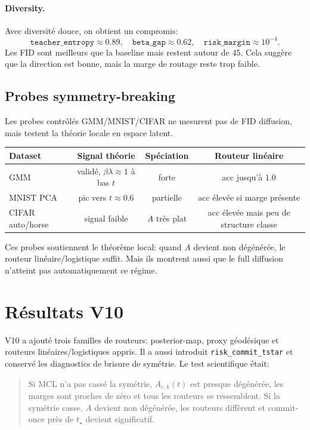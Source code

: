 \documentclass[11pt,a4paper]{article}
\newcommand{\1}{\mathbf{1}}
\begin{document}
\paragraph{Diversity.}
Avec diversité douce, on obtient un compromis:
\[
\texttt{teacher\_entropy}\approx 0.89,
\quad
\texttt{beta\_gap}\approx 0.62,
\quad
\texttt{risk\_margin}\approx 10^{-4}.
\]
Les FID sont meilleurs que la baseline mais restent autour de $45$. Cela suggère que la direction est bonne, mais la marge de routage reste trop faible.

\subsection{Probes symmetry-breaking}

Les probes contrôlés GMM/MNIST/CIFAR ne mesurent pas de FID diffusion, mais testent la théorie locale en espace latent.

\begin{center}
\begin{tabular}{lccc}
\toprule
Dataset & Signal théorie & Spéciation & Routeur linéaire\\
\midrule
GMM & validé, $\beta\lambda\approx1$ à bas $t$ & forte & acc jusqu'à $1.0$\\
MNIST PCA & pic vers $t\approx0.6$ & partielle & acc élevée si marge présente\\
CIFAR auto/horse & signal faible & $A$ très plat & acc élevée mais peu de structure classe\\
\bottomrule
\end{tabular}
\end{center}

Ces probes soutiennent le théorème local: quand $A$ devient non dégénérée, le routeur linéaire/logistique suffit. Mais ils montrent aussi que le full diffusion n'atteint pas automatiquement ce régime.

\section{Résultats V10}

V10 a ajouté trois familles de routeurs: posterior-map, proxy géodésique et routeurs linéaires/logistiques appris. Il a aussi introduit \texttt{risk\_commit\_tstar} et conservé les diagnostics de brisure de symétrie. Le test scientifique était:
\begin{quote}
Si MCL n'a pas cassé la symétrie, $A_{c,k}(t)$ est presque dégénérée, les marges sont proches de zéro et tous les routeurs se ressemblent. Si la symétrie casse, $A$ devient non dégénérée, les routeurs diffèrent et commit-once près de $t_\star$ devient significatif.
\end{quote}
\end{document}
